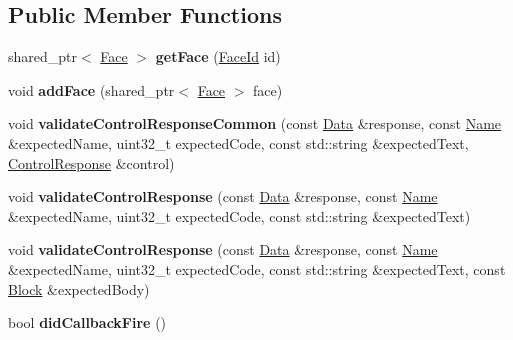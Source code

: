 \subsection*{Public Member Functions}
\begin{DoxyCompactItemize}
\item 
shared\+\_\+ptr$<$ \hyperlink{classnfd_1_1Face}{Face} $>$ {\bfseries get\+Face} (\hyperlink{classFaceId}{Face\+Id} id)\hypertarget{classnfd_1_1tests_1_1FibManagerFixture_a9e77ca04bc8422bc6668640cd7fcb96a}{}\label{classnfd_1_1tests_1_1FibManagerFixture_a9e77ca04bc8422bc6668640cd7fcb96a}

\item 
void {\bfseries add\+Face} (shared\+\_\+ptr$<$ \hyperlink{classnfd_1_1Face}{Face} $>$ face)\hypertarget{classnfd_1_1tests_1_1FibManagerFixture_a360e9c125d058860ab8168ffd028d81e}{}\label{classnfd_1_1tests_1_1FibManagerFixture_a360e9c125d058860ab8168ffd028d81e}

\item 
void {\bfseries validate\+Control\+Response\+Common} (const \hyperlink{classndn_1_1Data}{Data} \&response, const \hyperlink{classndn_1_1Name}{Name} \&expected\+Name, uint32\+\_\+t expected\+Code, const std\+::string \&expected\+Text, \hyperlink{classndn_1_1mgmt_1_1ControlResponse}{Control\+Response} \&control)\hypertarget{classnfd_1_1tests_1_1FibManagerFixture_a55f8c5d2d9f073d4eac05113f2fb104e}{}\label{classnfd_1_1tests_1_1FibManagerFixture_a55f8c5d2d9f073d4eac05113f2fb104e}

\item 
void {\bfseries validate\+Control\+Response} (const \hyperlink{classndn_1_1Data}{Data} \&response, const \hyperlink{classndn_1_1Name}{Name} \&expected\+Name, uint32\+\_\+t expected\+Code, const std\+::string \&expected\+Text)\hypertarget{classnfd_1_1tests_1_1FibManagerFixture_a4f21b2971b79625e35af1b039903a9c5}{}\label{classnfd_1_1tests_1_1FibManagerFixture_a4f21b2971b79625e35af1b039903a9c5}

\item 
void {\bfseries validate\+Control\+Response} (const \hyperlink{classndn_1_1Data}{Data} \&response, const \hyperlink{classndn_1_1Name}{Name} \&expected\+Name, uint32\+\_\+t expected\+Code, const std\+::string \&expected\+Text, const \hyperlink{classndn_1_1Block}{Block} \&expected\+Body)\hypertarget{classnfd_1_1tests_1_1FibManagerFixture_a378bd45dcee4e6c5921049b58391efac}{}\label{classnfd_1_1tests_1_1FibManagerFixture_a378bd45dcee4e6c5921049b58391efac}

\item 
bool {\bfseries did\+Callback\+Fire} ()\hypertarget{classnfd_1_1tests_1_1FibManagerFixture_aa0eced77f4e8ee9a714ce0f5ffe4f3f9}{}\label{classnfd_1_1tests_1_1FibManagerFixture_aa0eced77f4e8ee9a714ce0f5ffe4f3f9}


\end{DoxyCompactItemize}
